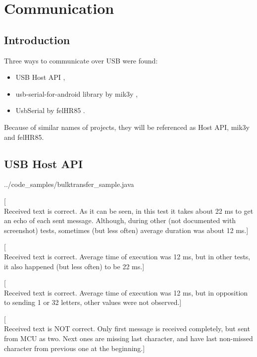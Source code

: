 \chapter{Communication}

\section{Introduction}
Three ways to communicate over USB were found:
\begin{itemize}
  \item USB Host API \cite{android_reference},
  \item usb-serial-for-android library by mik3y \cite{mik3y},
  \item UsbSerial by felHR85 \cite{felHR85}.
\end{itemize}
Because of similar names of projects, they will be referenced as Host API,
mik3y and felHR85.


\section{USB Host API}


{../code_samples/bulktransfer_sample.java}

[\\Received text is correct. 
As it can be seen, in this test it takes about 22 ms to get an echo of each sent
message.
Although, during other (not documented with screenshot) tests, sometimes (but
less often) average duration was about 12 ms.]

[\\Received text is correct. 
Average time of execution was 12 ms, but in other tests, it also happened (but
less often) to be 22 ms.]

[\\Received text is correct. 
Average time of execution was 12 ms, but in opposition to sending 1 or 32
letters, other values were not observed.]

[\\Received text is NOT correct. 
Only first message is received completely, but sent from MCU as two.
Next ones are missing last character, and have last non-missed character from
previous one at the beginning.]


